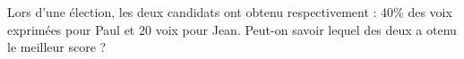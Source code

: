 
\begin{exercice}\label{exosmath-0796}


 Lors d'une élection, les deux candidats ont obtenu respectivement : $40\%$ des voix exprimées pour Paul et $20$ voix pour Jean. Peut-on savoir lequel des deux a otenu le meilleur score ?

\end{exercice}
